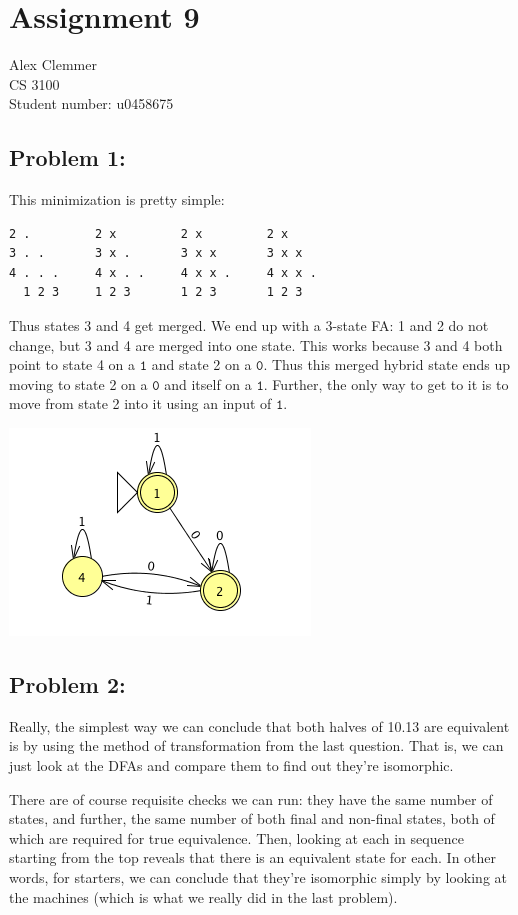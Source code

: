 \documentclass[a4paper]{article}
\begin{document}
\section*{Assignment 9}
Alex Clemmer\\
CS 3100 \\
Student number: u0458675

\subsection*{Problem 1:}

This minimization is pretty simple:

\begin{verbatim}
2 .         2 x         2 x         2 x
3 . .       3 x .       3 x x       3 x x
4 . . .     4 x . .     4 x x .     4 x x .
  1 2 3     1 2 3       1 2 3       1 2 3       
\end{verbatim}

Thus states 3 and 4 get merged. We end up with a 3-state FA: 1 and 2 do not change, but 3 and 4 are merged into one state. This works because 3 and 4 both point to state 4 on a $\texttt{1}$ and state 2 on a $\texttt{0}$. Thus this merged hybrid state ends up moving to state 2 on a $\texttt{0}$ and itself on a $\texttt{1}$. Further, the only way to get to it is to move from state 2 into it using an input of $\texttt{1}$.

\includegraphics[scale=0.60]{1_DFA.png}

\subsection*{Problem 2:} 

Really, the simplest way we can conclude that both halves of 10.13 are equivalent is by using the method of transformation from the last question. That is, we can just look at the DFAs and compare them to find out they're isomorphic.

There are of course requisite checks we can run: they have the same number of states, and further, the same number of both final and non-final states, both of which are required for true equivalence. Then, looking at each in sequence starting from the top reveals that there is an equivalent state for each. In other words, for starters, we can conclude that they're isomorphic simply by looking at the machines (which is what we really did in the last problem).
\end{document}
